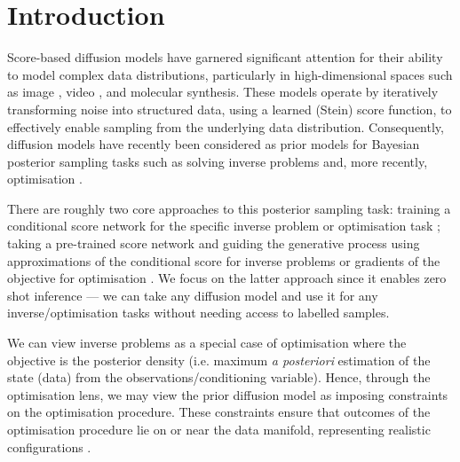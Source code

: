 \chapter{Introduction}

Score-based diffusion models
\parencite{pmlr-v37-sohl-dickstein15,hoDenoisingDiffusionProbabilistic2020,songGenerativeModelingEstimating2020}
have garnered significant attention for their ability to model complex data distributions,
particularly in high-dimensional spaces such as image
\parencite{dhariwalDiffusionModelsBeat2021,rombachHighResolutionImageSynthesis2021},
video \parencite{hoVideoDiffusionModels2022}, and molecular
\parencite{xuGeoDiffGeometricDiffusion2022} synthesis. These models operate by iteratively
transforming noise into structured data, using a learned (Stein) score function, to effectively enable
sampling from the underlying data distribution. Consequently, diffusion models have recently been
considered as prior models for Bayesian posterior sampling tasks such as solving inverse problems
\parencite{songGenerativeModelingEstimating2020} and, more recently, optimisation
\parencite{krishnamoorthyDiffusionModelsBlackBox2023,guoGradientGuidanceDiffusion2024,kongDiffusionModelsConstrained2024}.

There are roughly two core approaches to this posterior sampling task: training a conditional score
network for the specific inverse problem
\parencite{songGenerativeModelingEstimating2020,nicholGLIDEPhotorealisticImage2021, sahariaPaletteImagetoImageDiffusion2021,sahariaPhotorealisticTexttoImageDiffusion2022}
or optimisation task \parencite{krishnamoorthyDiffusionModelsBlackBox2023,guoGradientGuidanceDiffusion2024};
taking a pre-trained score network and guiding the generative process using approximations of the
conditional score for inverse problems
\parencite{chungDiffusionPosteriorSampling2022,song2023pseudoinverseguided,boysTweedieMomentProjected2023}
or gradients of the objective for optimisation \parencite{kongDiffusionModelsConstrained2024}. We
focus on the latter approach since it enables zero shot inference --- we can take any diffusion
model and use it for any inverse/optimisation tasks without needing access to labelled samples.

We can view inverse problems as a special case of optimisation where the objective is the posterior
density (i.e. maximum \emph{a posteriori} estimation of the state (data) from the
observations/conditioning variable). Hence, through the optimisation lens, we may view the prior
diffusion model as imposing constraints on the optimisation procedure. These constraints ensure
that outcomes of the optimisation procedure lie on or near the data manifold, representing
realistic configurations \parencite{kongDiffusionModelsConstrained2024}.

